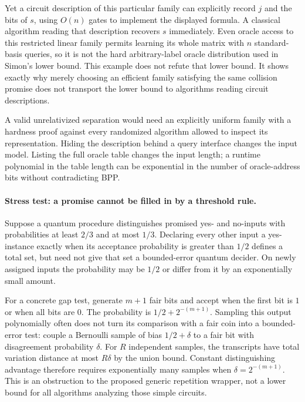 \documentclass[11pt]{article}
\begin{document}
Yet a circuit description of this particular family can explicitly record
$j$ and the bits of $s$, using $O(n)$ gates to implement the displayed
formula. A classical algorithm reading that description recovers $s$
immediately. Even oracle access to this restricted linear family permits
learning its whole matrix with $n$ standard-basis queries, so it is not the
hard arbitrary-label oracle distribution used in Simon's lower bound.
This example does not refute that lower bound. It shows exactly why merely
choosing an efficient family satisfying the same collision promise does not
transport the lower bound to algorithms reading circuit descriptions.

A valid unrelativized separation would need an explicitly uniform family
with a hardness proof against every randomized algorithm allowed to inspect
its representation. Hiding the description behind a query interface changes
the input model. Listing the full oracle table changes the input length;
a runtime polynomial in the table length can be exponential in the number
of oracle-address bits without contradicting BPP.

\paragraph{Stress test: a promise cannot be filled in by a threshold rule.}
Suppose a quantum procedure distinguishes promised yes- and no-inputs with
probabilities at least $2/3$ and at most $1/3$. Declaring every other input
a yes-instance exactly when its acceptance probability is greater than
$1/2$ defines a total set, but need not give that set a bounded-error quantum
decider. On newly assigned inputs the probability may be $1/2$ or differ
from it by an exponentially small amount.

For a concrete gap test, generate $m+1$ fair bits and accept when the first
bit is $1$ or when all bits are $0$. The probability is
$1/2+2^{-(m+1)}$. Sampling this output polynomially often does not turn its
comparison with a fair coin into a bounded-error test: couple a Bernoulli
sample of bias $1/2+\delta$ to a fair bit with disagreement probability
$\delta$. For $R$ independent samples, the transcripts have total variation
distance at most $R\delta$ by the union bound. Constant distinguishing
advantage therefore requires exponentially many samples when
$\delta=2^{-(m+1)}$. This is an obstruction to the proposed generic repetition
wrapper, not a lower bound for all algorithms analyzing those simple circuits.
\end{document}
